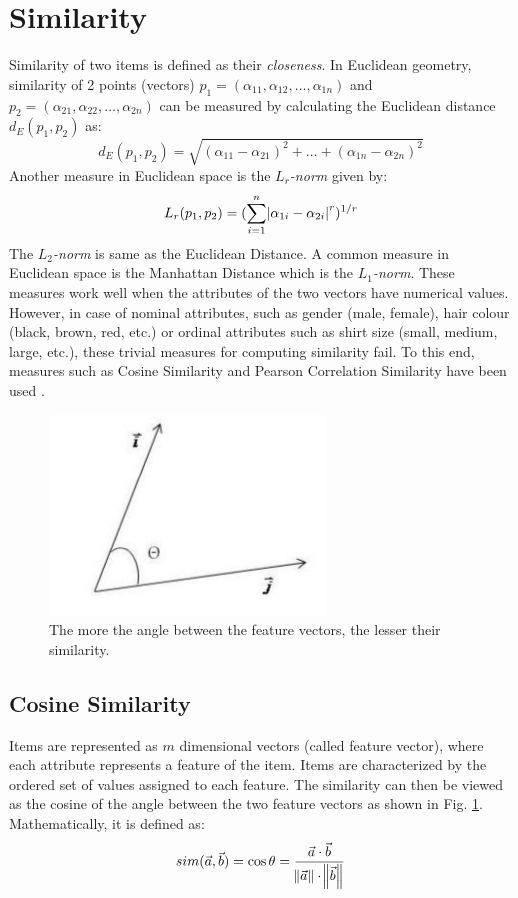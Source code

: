 \section{Similarity}
Similarity of two items is defined as their \textit{closeness}. In Euclidean geometry, similarity of 2 points (vectors) $p_1=(\alpha_{11}, \alpha_{12},\dots,\alpha_{1n})$ and $p_2=(\alpha_{21}, \alpha_{22},\dots,\alpha_{2n})$ can be measured by calculating the Euclidean distance $d_E(p_1,p_2)$ as:
\begin{equation}
d_E(p_1,p_2) = \sqrt{(\alpha_{11}-\alpha_{21})^2+\dots +(\alpha_{1n}-\alpha_{2n})^2} \nonumber
\end{equation}
Another measure in Euclidean space is the \textit{$L_r$-norm} given by:
\begin{equation}
L_r(p_1,p_2) = (\displaystyle\sum_{i=1}^n \abs{\alpha_{1i}-\alpha_{2i}}^r)^{1/r}
\end{equation}
The \textit{$L_2$-norm} is same as the Euclidean Distance. A common measure in Euclidean space is the Manhattan Distance which is the \textit{$L_1$-norm}. These measures work well when the attributes of the two vectors have numerical values. However, in case of nominal attributes, such as gender (male, female), hair colour (black, brown, red, etc.) or ordinal attributes such as shirt size (small, medium, large, etc.), these trivial measures for computing similarity fail. To this end, measures such as Cosine Similarity and Pearson Correlation Similarity have been used \cite{almazro:survey}.

\begin{figure}[ht]
\centering
\includegraphics[height=0.35\columnwidth]{cosine}
\caption{The more the angle between the feature vectors, the lesser their similarity.}
\label{fig:cosine}
\end{figure}
\subsection{Cosine Similarity}
Items are represented as $m$ dimensional vectors (called feature vector), where each attribute represents a feature of the item. Items are characterized by the ordered set of values assigned to each feature. The similarity can then be viewed as the cosine of the angle between the two feature vectors as shown in Fig. \ref{fig:cosine}. Mathematically, it is defined as:
\begin{equation}
sim(\vec{a},\vec{b})=\cos\theta=\frac{\vec{a}\cdot\vec{b}}{\norm{\vec{a}}\cdot\norm{\vec{b}}}
\end{equation}

